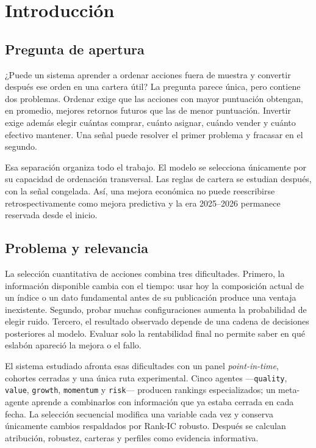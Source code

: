 \chapter{Introducción}
\label{chap:introduccion}

\section*{Pregunta de apertura}

¿Puede un sistema aprender a ordenar acciones fuera de muestra y convertir después ese orden en una
cartera útil? La pregunta parece única, pero contiene dos problemas. Ordenar exige que las acciones
con mayor puntuación obtengan, en promedio, mejores retornos futuros que las de menor puntuación.
Invertir exige además elegir cuántas comprar, cuánto asignar, cuándo vender y cuánto efectivo
mantener. Una señal puede resolver el primer problema y fracasar en el segundo.

Esa separación organiza todo el trabajo. El modelo se selecciona únicamente por su capacidad de
ordenación transversal. Las reglas de cartera se estudian después, con la señal congelada. Así, una
mejora económica no puede reescribirse retrospectivamente como mejora predictiva y la era
2025--2026 permanece reservada desde el inicio.

\section{Problema y relevancia}

La selección cuantitativa de acciones combina tres dificultades. Primero, la información disponible
cambia con el tiempo: usar hoy la composición actual de un índice o un dato fundamental antes de su
publicación produce una ventaja inexistente. Segundo, probar muchas configuraciones aumenta la
probabilidad de elegir ruido. Tercero, el resultado observado depende de una cadena de decisiones
posteriores al modelo. Evaluar solo la rentabilidad final no permite saber en qué eslabón apareció la
mejora o el fallo.

El sistema estudiado afronta esas dificultades con un panel \textit{point-in-time}, cohortes
cerradas y una única ruta experimental. Cinco agentes ---\texttt{quality}, \texttt{value},
\texttt{growth}, \texttt{momentum} y \texttt{risk}--- producen rankings especializados; un
meta-agente aprende a combinarlos con información que ya estaba cerrada en cada fecha. La selección
secuencial modifica una variable cada vez y conserva únicamente cambios respaldados por Rank-IC
robusto. Después se calculan atribución, robustez, carteras y perfiles como evidencia informativa.

